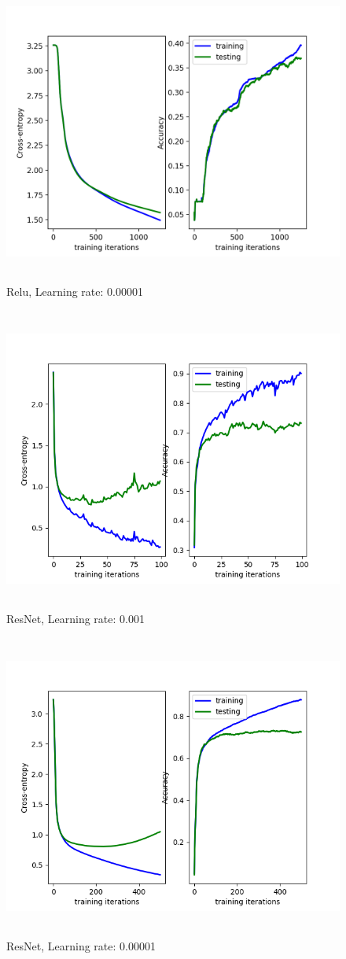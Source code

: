 \documentclass[a4paper]{article}
\begin{document}
\begin{figure}[h]
\caption{Relu, Learning rate: 0.00001}
\centering
\includegraphics[width=12cm, height=10cm]{LR00001IT1250.png}
\end{figure}

\begin{figure}[h]
\caption{ResNet, Learning rate: 0.001}
\centering
\includegraphics[width=12cm, height=10cm]{RES001.png}
\end{figure}

\begin{figure}[h]
\caption{ResNet, Learning rate: 0.00001}
\centering
\includegraphics[width=12cm, height=10cm]{RES00001.png}
\end{figure}
\end{document}
